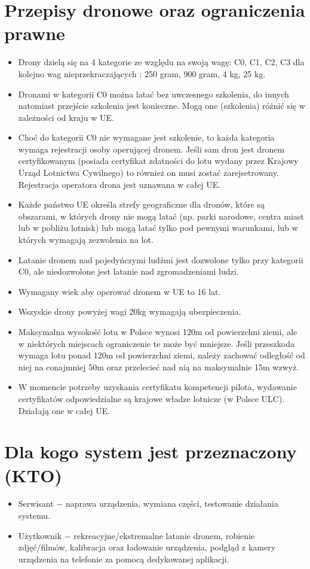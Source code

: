 \documentclass[12pt]{article}
\begin{document}
\section{Przepisy dronowe oraz ograniczenia prawne}
\begin{itemize}
    \item Drony dzielą się na 4 kategorie ze względu na swoją wagę: C0, C1, C2, C3 dla kolejno wag nieprzekraczających : 250 gram, 900 gram, 4 kg, 25 kg.
    \item Dronami w kategorii C0 można latać bez uwczesnego szkolenia, do innych natomiast przejście szkolenia jest konieczne. Mogą one (szkolenia) różnić się w zależności od kraju w UE.
    \item Choć do kategorii C0 nie wymagane jest szkolenie, to każda kategoria wymaga rejestracji osoby operującej dronem. Jeśli sam dron jest dronem certyfikowanym (posiada certyfikat zdatności do lotu wydany przez Krajowy Urząd Lotnictwa Cywilnego) to również on musi zostać zarejsetrowany. Rejestracja operatora drona jest uznawana w całej UE. 
    \item Każde państwo UE określa strefy geograficzne dla dronów, które są obszarami, w których drony nie mogą latać (np. parki narodowe, centra miast lub w pobliżu lotnisk) lub mogą latać tylko pod pewnymi warunkami, lub w których wymagają zezwolenia na lot.
    \item Latanie dronem nad pojedyńczymi ludźmi jest dozwolone tylko przy kategorii C0, ale niedozwolone jest latanie nad zgromadzeniami ludzi.
    \item Wymagany wiek aby operować dronem w UE to 16 lat.
    \item Wszyskie drony powyżej wagi 20kg wymagają ubezpieczenia.
    \item Maksymalna wysokość lotu w Polsce wynosi 120m od powierzchni ziemi, ale w niektórych miejscach ograniczenie te może być mniejsze. Jeśli przeszkoda wymaga lotu ponad 120m od powierzchni ziemi, należy zachować odległość od niej na conajmniej 50m oraz przelecieć nad nią na maksymalnie 15m wzwyż. 
    \item W momencie potrzeby uzyskania certyfikatu kompetencji pilota, wydawanie certyfikatów odpowiedzialne są krajowe władze lotnicze (w Polsce ULC). Działają one w całej UE.
\end{itemize}
\section{Dla kogo system jest przeznaczony (KTO)}
\begin{itemize}
    \item Serwisant $-$ naprawa urządzenia, wymiana części, testowanie działania systemu.
    \item Użytkownik $-$ rekreacyjne/ekstremalne latanie dronem, robienie zdjęć/filmów, kalibracja oraz ładowanie urządzenia, podgląd z kamery urządzenia na telefonie za pomocą dedykowanej aplikacji.  
\end{itemize}
\end{document}
